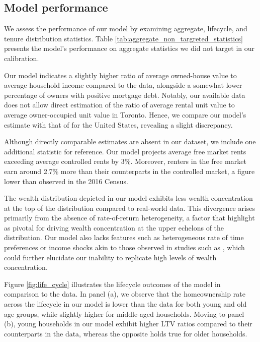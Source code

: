 \documentclass[parskip=full]{article}
\begin{document}
\subsection{Model performance}\label{subsection:non_targeted_statistics}

We assess the performance of our model by examining aggregate, lifecycle, and tenure distribution statistics. Table \ref{tab:aggregate_non_targreted_statistics} presents the model's performance on aggregate statistics we did not target in our calibration.

Our model indicates a slightly higher ratio of average owned-house value to average household income compared to the data, alongside a somewhat lower percentage of owners with positive mortgage debt. Notably, our available data does not allow direct estimation of the ratio of average rental unit value to average owner-occupied unit value in Toronto. Hence, we compare our model's estimate with that of \citet{chatterjee-eyigungor-2015} for the United States, revealing a slight discrepancy.

Although directly comparable estimates are absent in our dataset, we include one additional statistic for reference. Our model projects average free market rents exceeding average controlled rents by 3\%. Moreover, renters in the free market earn around 2.7\% more than their counterparts in the controlled market, a figure lower than observed in the 2016 Census.

The wealth distribution depicted in our model exhibits less wealth concentration at the top of the distribution compared to real-world data. This divergence arises primarily from the absence of rate-of-return heterogeneity, a factor that \citet{fagereng} highlight as pivotal for driving wealth concentration at the upper echelons of the distribution. Our model also lacks features such as heterogeneous rate of time preferences \citep{ks-1998} or income shocks akin to those observed in studies such as \citet{mj-shocks}, which could further elucidate our inability to replicate high levels of wealth concentration.

Figure \ref{fig:life_cycle} illustrates the lifecycle outcomes of the model in comparison to the data. In panel (a), we observe that the homeownership rate across the lifecycle in our model is lower than the data for both young and old age groups, while slightly higher for middle-aged households. Moving to panel (b), young households in our model exhibit higher LTV ratios compared to their counterparts in the data, whereas the opposite holds true for older households.
\end{document}
